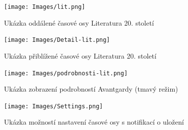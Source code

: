 \begin{figure}[h]
    \centering
    \texttt{[image: Images/lit.png]}
    \caption{Ukázka oddálené časové osy Literatura 20. století}
    \label{fig:lit}
\end{figure}

\begin{figure}[h]
    \centering
    \texttt{[image: Images/Detail-lit.png]}
    \caption{Ukázka přiblížené časové osy Literatura 20. století}
    \label{fig:Detail-lit}
\end{figure}

\begin{figure}[h]
    \centering
    \texttt{[image: Images/podrobnosti-lit.png]}
    \caption{Ukázka zobrazení podrobností Avantgardy (tmavý režim)}
    \label{fig:podrobnosti-lit}
\end{figure}

\begin{figure}[h]
    \centering
    \texttt{[image: Images/Settings.png]}
    \caption{Ukázka možností nastavení časové osy s notifikací o uložení}
    \label{fig:Settings}
\end{figure}